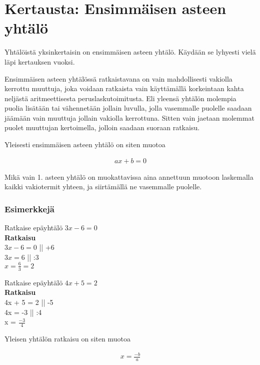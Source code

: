 \chapter{Kertausta: Ensimmäisen asteen yhtälö}

Yhtälöistä yksinkertaisin on ensimmäisen asteen yhtälö. Käydään se lyhyesti
vielä läpi kertauksen vuoksi.

Ensimmäisen asteen yhtälössä ratkaistavana on vain mahdollisesti vakiolla
kerrottu muuttuja, joka voidaan ratkaista vain käyttämällä korkeintaan
kahta neljästä aritmeettisesta peruslaskutoimitusta. Eli yleensä
yhtälön molempia puolia lisätään tai vähennetään jollain luvulla, jolla
vasemmalle puolelle saadaan jäämään vain muuttuja jollain vakiolla kerrottuna.
Sitten vain jaetaan molemmat puolet muuttujan kertoimella, jolloin saadaan
suoraan ratkaisu.

Yleisesti ensimmäisen asteen yhtälö on siten muotoa

\begin{align*}
    ax + b = 0
\end{align*}

Mikä vain 1. asteen yhtälö on muokattavissa aina
annettuun muotoon laskemalla kaikki vakiotermit yhteen,
ja siirtämällä ne vasemmalle puolelle.

\subsection*{Esimerkkejä}

\begin{esimerkki}
Ratkaise epäyhtälö $3x - 6 = 0$ \\
\textbf{Ratkaisu} \\
    $3x - 6 = 0$   \quad || +6 \\
    $3x = 6$       \quad || :3 \\
     $x = \frac{6}{3} = 2$
\end{esimerkki}

\begin{esimerkki}
Ratkaise epäyhtälö $4x + 5 = 2$ \\
\textbf{Ratkaisu} \\
    4x + 5 = 2     \quad || -5 \\
    4x = -3        \quad || :4 \\
     x = $\frac{-3}{4}$
\end{esimerkki}

Yleisen yhtälön ratkaisu on siten muotoa

\begin{align*}
  x = \frac{-b}{a}
\end{align*}

